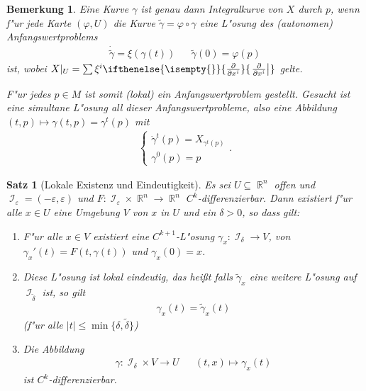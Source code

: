 \documentclass[paper=A4, twoside, chapterprefix=true, bibliography=totoc, headsepline]{scrbook}
\let\temp\phi
\let\phi\varphi
\let\varphi\temp
\let\temp\theta
\let\theta\vartheta
\let\vartheta\temp
\let\temp\epsilon
\let\epsilon\varepsilon
\let\varepsilon\temp
\let\temp\rho
\let\rho\varrho
\let\varrho\temp
\DeclareMathOperator{\R}{\mathbb{R}}
\DeclareMathOperator{\calI}{\mathcal{I}}
\newcommand{\pdifffrac}[3][]{\ifthenelse{\isempty{#1}}{\frac{\partial #2}{\partial #3}}{\left. \frac{\partial #2}{\partial #3} \right|_{#1}}}
\theoremstyle{plain}
\newtheorem{Satz}[Dfn]{Satz}
\theoremstyle{nonumberplain}
\newtheorem{bem}{Bemerkung}
\theoremstyle{empty}
\theoremstyle{break}
\newcommand{\quot}[1]{\textrm{\glqq}{#1}\textrm{\grqq}}
\begin{document}
\begin{bem}
  Eine Kurve $\gamma$ ist genau dann Integralkurve von $X$ durch $p$, wenn f"ur jede Karte $(\phi,U)$ die Kurve $\tilde \gamma = \phi \circ \gamma$ eine L"osung des (autonomen) Anfangswertproblems
  \begin{align*}
    \dot{\tilde \gamma} = \xi(\gamma(t)) && \tilde \gamma(0) = \phi(p)
  \end{align*}
  ist, wobei $X|_U = \sum \xi^i \pdifffrac{}{x^i}$ gelte.

  F"ur jedes $p \in M$ ist somit (lokal) ein Anfangswertproblem gestellt.
  Gesucht ist eine \quot{simultane} L"osung all dieser Anfangswertprobleme, also eine Abbildung $(t,p) \mapsto \gamma(t,p) = \gamma^t(p)$ mit 
  \begin{align*}
    \begin{cases}
      \dot \gamma^t(p) = X_{\gamma^t(p)}\\
      \gamma^0(p) = p
    \end{cases}.
  \end{align*}
\end{bem}

\begin{Satz}[Lokale Existenz und Eindeutigkeit]\label{satz-4-6}
  Es sei $U \subseteq \R^n$ offen und $\calI_{\epsilon}=(-\epsilon,\epsilon)$ und $F \colon \calI_{\epsilon} \times \R^n \to \R^n$ $C^k$-differenzierbar.
  Dann existiert f"ur alle $x \in U$ eine Umgebung $V$ von $x$ in $U$ und ein $\delta > 0$, so dass gilt:
  \begin{enumerate}[label=(\roman*),leftmargin=*,widest=iii]
  \item F"ur alle $x \in V$ existiert eine $C^{k+1}$-L"osung $\gamma_x\colon \calI_{\delta} \to V$, von $\gamma_x'(t)=F(t,\gamma(t))$ und $\gamma_x(0) = x$.
  \item\label{satz-4-6-ii} Diese L"osung ist lokal eindeutig, das hei\ss t falls $\tilde \gamma_x$ eine weitere L"osung auf $\calI_{\tilde\delta}$ ist, so gilt
    \begin{align*}
      \gamma_x(t) = \tilde \gamma_x(t)
    \end{align*}
    (f"ur alle $|t| \leq \min\{\delta, \tilde\delta\}$)
  \item Die Abbildung 
    \begin{align*}
      \gamma\colon \calI_{\delta} \times V \to U && (t,x) \mapsto \gamma_x(t)
    \end{align*}
    ist $C^k$-differenzierbar.
  \end{enumerate}
\end{Satz}
\end{document}
